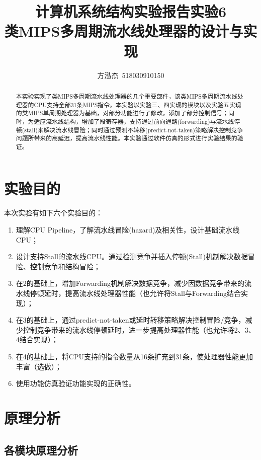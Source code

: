 \documentclass{cumcm}
\title{\textbf{计算机系统结构实验报告\quad 实验6}\\{\Large 类MIPS多周期流水线处理器的设计与实现}}
\author{方泓杰\ 518030910150}
\numberwithin{equation}{section}
\numberwithin{equation}{subsection}
\begin{document}
\maketitle

\begin{abstract}
  本实验实现了类MIPS多周期流水线处理器的几个重要部件，该类MIPS多周期流水线处理器的CPU支持全部31条MIPS指令。本实验以实验三、四实现的模块以及实验五实现的类MIPS单周期处理器为基础，对部分功能进行了修改，添加了部分控制信号；同时，为适应流水线结构，增加了段寄存器，支持通过前向通路(forwarding)与流水线停顿(stall)来解决流水线冒险；同时通过预测不转移(predict-not-taken)策略解决控制竞争问题所带来的高延迟，提高流水线性能。本实验通过软件仿真的形式进行实验结果的验证。
\end{abstract}

\maketitle \tableofcontents
\newpage

\section{实验目的}\label{section1}
本次实验有如下六个实验目的：
\begin{enumerate}
    \item 理解CPU Pipeline，了解流水线冒险(hazard)及相关性，设计基础流水线CPU；
    \item 设计支持Stall的流水线CPU。通过检测竞争并插入停顿(Stall)机制解决数据冒险、控制竞争和结构冒险；
    \item 在2的基础上，增加Forwarding机制解决数据竞争，减少因数据竞争带来的流水线停顿延时，提高流水线处理器性能（也允许将Stall与Forwarding结合实现）；
    \item 在3的基础上，通过predict-not-taken或延时转移策略解决控制冒险/竞争，减少控制竞争带来的流水线停顿延时，进一步提高处理器性能（也允许将2、3、4结合实现）；
    \item 在4的基础上，将CPU支持的指令数量从16条扩充到31条，使处理器性能更加丰富（选做）；
    \item 使用功能仿真验证功能实现的正确性。
\end{enumerate}

\section{原理分析}\label{section2}

\subsection{各模块原理分析}\label{section2.1}
\end{document}
